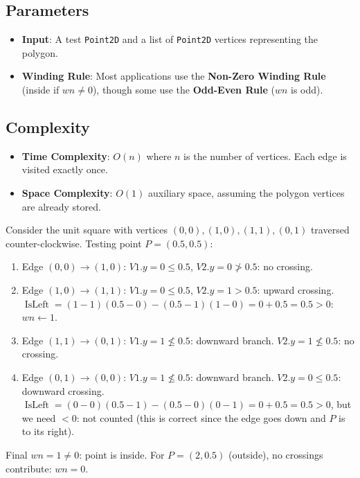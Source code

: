 \subsection{Parameters}

\begin{itemize}
\item \textbf{Input}: A test \texttt{Point2D} and a list of \texttt{Point2D} vertices representing the polygon.
\item \textbf{Winding Rule}: Most applications use the \textbf{Non-Zero Winding Rule} (inside if $wn \ne 0$), though some use the \textbf{Odd-Even Rule} ($wn$ is odd).
\end{itemize}

\subsection{Complexity}

\begin{itemize}
\item \textbf{Time Complexity}: $O(n)$ where $n$ is the number of vertices. Each edge is visited exactly once.
\item \textbf{Space Complexity}: $O(1)$ auxiliary space, assuming the polygon vertices are already stored.
\end{itemize}

\begin{example}\label{ex:winding_square}
Consider the unit square with vertices $(0,0), (1,0), (1,1), (0,1)$ traversed counter-clockwise. Testing point $P = (0.5, 0.5)$:
\begin{enumerate}
\item Edge $(0,0) \to (1,0)$: $V1.y = 0 \le 0.5$, $V2.y = 0 \not> 0.5$: no crossing.
\item Edge $(1,0) \to (1,1)$: $V1.y = 0 \le 0.5$, $V2.y = 1 > 0.5$: upward crossing. $\operatorname{IsLeft} = (1-1)(0.5-0) - (0.5-1)(1-0) = 0 + 0.5 = 0.5 > 0$: $wn \gets 1$.
\item Edge $(1,1) \to (0,1)$: $V1.y = 1 \not\le 0.5$: downward branch. $V2.y = 1 \not\le 0.5$: no crossing.
\item Edge $(0,1) \to (0,0)$: $V1.y = 1 \not\le 0.5$: downward branch. $V2.y = 0 \le 0.5$: downward crossing. $\operatorname{IsLeft} = (0-0)(0.5-1) - (0.5-0)(0-1) = 0 + 0.5 = 0.5 > 0$, but we need $< 0$: not counted (this is correct since the edge goes down and $P$ is to its right).
\end{enumerate}
Final $wn = 1 \ne 0$: point is inside. For $P = (2, 0.5)$ (outside), no crossings contribute: $wn = 0$.
\end{example}

